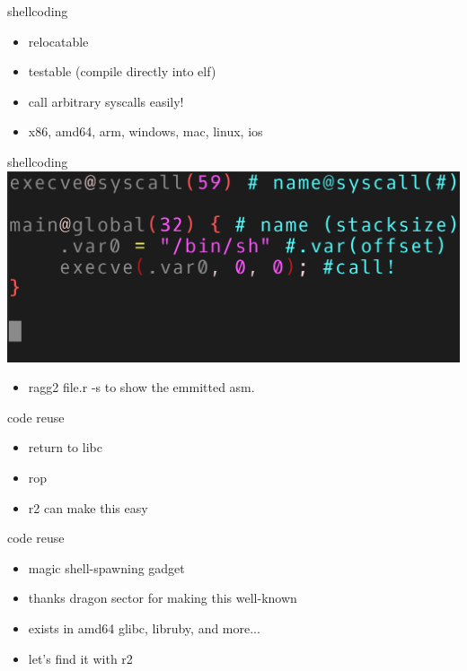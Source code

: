 \documentclass[10pt,pdf,utf8,english,compress,hyperref={unicode}]{beamer}
\begin{document}
\begin{frame}{shellcoding}
	\begin{itemize}
		\item relocatable
		\item testable (compile directly into elf)
		\item call arbitrary syscalls easily!
		\item x86, amd64, arm, windows, mac, linux, ios
	\end{itemize}
\end{frame}

\begin{frame}{shellcoding}
	\includegraphics[width=\textwidth]{cr_images/shellcode.png}
	\begin{itemize}
		\item ragg2 file.r -s to show the emmitted asm.
	\end{itemize}
\end{frame}

\begin{frame}{code reuse}
	\begin{itemize}
		\item return to libc
		\item rop
		\item r2 can make this easy
	\end{itemize}
\end{frame}

\begin{frame}{code reuse}
	\begin{itemize}
		\item magic shell-spawning gadget
		\item thanks dragon sector for making this well-known
		\item exists in amd64 glibc, libruby, and more...
		\item let's find it with r2
	\end{itemize}
\end{frame}
\end{document}
